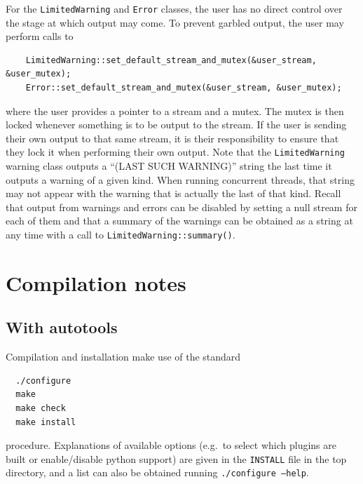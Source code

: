 \documentclass[12pt,a4]{article}
\newcommand{\ttt}[1]{{\small\texttt{#1}}}
\begin{document}
For the \ttt{LimitedWarning} and \ttt{Error} classes, the user has no
direct control over the stage at which output may come.
%
To prevent garbled output, the user may perform calls to
\begin{lstlisting}
    LimitedWarning::set_default_stream_and_mutex(&user_stream, &user_mutex);
    Error::set_default_stream_and_mutex(&user_stream, &user_mutex);
\end{lstlisting}
where the user provides a pointer to a stream and a mutex.
%
The mutex is then locked whenever something is to be output to the
stream.
%
If the user is sending their own output to that same stream, it is
their responsibility to ensure that they lock it when performing their
own output.
%
Note that the \ttt{LimitedWarning} warning class outputs a ``(LAST
SUCH WARNING)'' string the last time it outputs a warning of a given
kind.
%
When running concurrent threads, that string may not appear with the
warning that is actually the last of that kind.
%
Recall that output from warnings and errors can be disabled by setting
a null stream for each of them and that a summary of the warnings can
be obtained as a string at any time with a call to
\ttt{LimitedWarning::summary()}. 

\section{Compilation notes}

\subsection{With autotools}

Compilation and installation make use of the standard
\begin{verbatim}
  ./configure
  make
  make check
  make install
\end{verbatim}
procedure. Explanations of available options (e.g.\ to select which
plugins are built or enable/disable python support) are given in the
\ttt{INSTALL} file in the top directory, and a list can also be
obtained running \ttt{./configure --help}.
\end{document}
